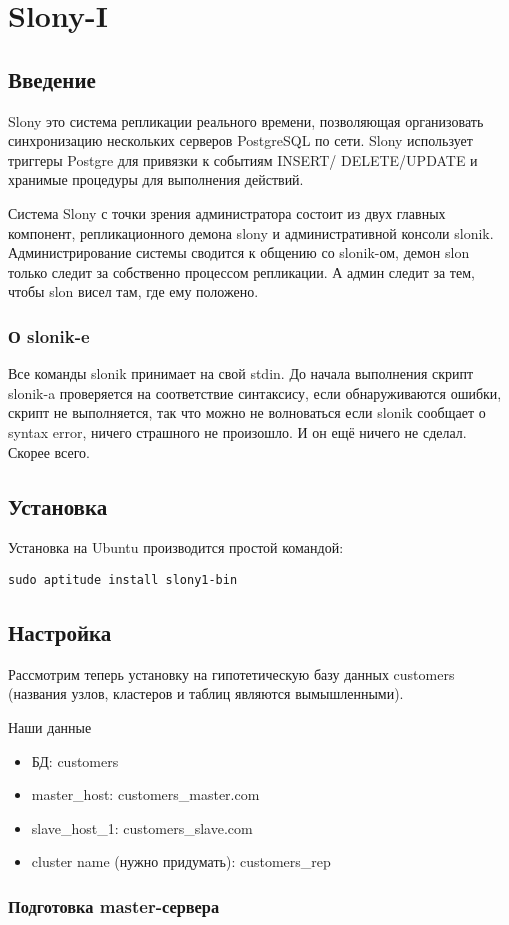 \section{Slony-I}
\subsection{Введение}
Slony это система репликации реального времени, позволяющая организовать синхронизацию нескольких серверов 
PostgreSQL по сети. Slony использует триггеры Postgre для привязки к событиям INSERT/ DELETE/UPDATE и 
хранимые процедуры для выполнения действий.

Система Slony с точки зрения администратора состоит из двух главных компонент, репликационного демона slony и 
административной консоли slonik. Администрирование системы сводится к общению со slonik-ом, демон slon только 
следит за собственно процессом репликации. А админ следит за тем, чтобы slon висел там, где ему положено. 

\subsubsection{О slonik-e}
Все команды slonik принимает на свой stdin. До начала выполнения скрипт slonik-a проверяется на соответствие синтаксису, 
если обнаруживаются ошибки, скрипт не выполняется, так что можно не волноваться если slonik сообщает о syntax error, 
ничего страшного не произошло. И он ещё ничего не сделал. Скорее всего. 

\subsection{Установка}
Установка на Ubuntu производится простой командой:
\begin{verbatim}
sudo aptitude install slony1-bin
\end{verbatim}

\subsection{Настройка}
Рассмотрим теперь установку на гипотетическую базу данных customers 
(названия узлов, кластеров и таблиц являются вымышленными).

Наши данные
\begin{itemize}
\item БД: customers
\item master\_host: customers\_master.com
\item slave\_host\_1: customers\_slave.com
\item cluster name (нужно придумать): customers\_rep
\end{itemize}

\subsubsection{Подготовка master-сервера}